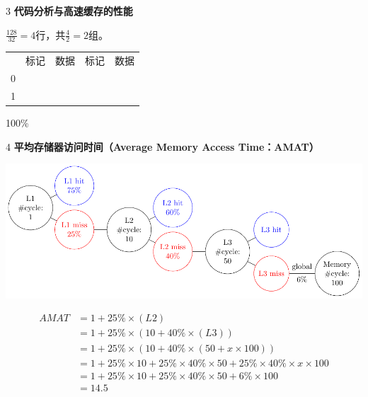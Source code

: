 \documentclass[12pt,a4paper]{article}
\newenvironment{problems}{\begin{list}{}{\renewcommand{\makelabel}[1]{\textbf{##1}.\hfil}}}{\end{list}}
\begin{document}
\begin{problems}
    \item[3] \textbf{代码分析与高速缓存的性能}
    
    $\frac{128}{32}=4$行，共$\frac{4}{2}=2$组。

    \begin{tabular}{c|c|c|c|c|}
        \cline{2-5}
        & 标记 & 数据 & 标记 & 数据 \\
        \cline{2-5}
        0 & & & & \\
        \cline{2-5}
        1 & & & & \\
        \cline{2-5}
    \end{tabular}

    
    100\%

    \item[4] \textbf{平均存储器访问时间（Average Memory Access Time：AMAT）}
     
    \includegraphics[width=\textwidth]{cache.pdf}

    \begin{align*}
        \mathit{AMAT}&=1+25\%\times (L2)\\
                    &=1+25\%\times (10+40\%\times (L3))\\
                    &=1+25\%\times(10+40\%\times(50+x\times 100))\\
                    &=1+25\%\times 10 + 25\%\times 40\% \times 50 + 25\%\times 40\% \times x\times 100\\
                    &=1+25\%\times 10 + 25\%\times 40\% \times 50 + 6\%\times 100\\
                    &=14.5
    \end{align*}


\end{problems}
\end{document}
